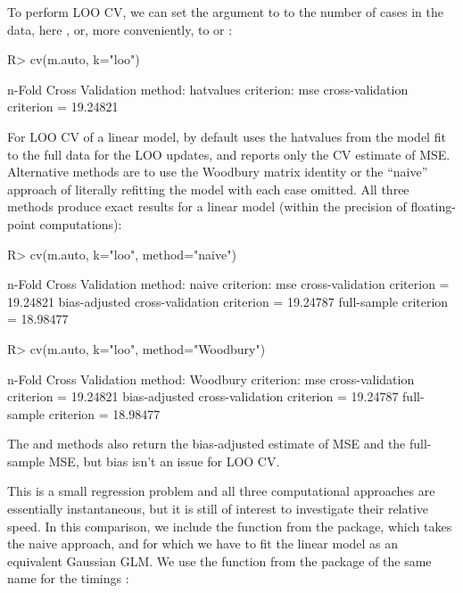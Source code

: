 \documentclass[
]{jss}
\begin{document}
To perform LOO CV, we can set the  argument to  to
the number of cases in the data, here , or, more
conveniently, to  or :

\begin{CodeChunk}
\begin{CodeInput}
R> cv(m.auto, k="loo")
\end{CodeInput}
\begin{CodeOutput}
n-Fold Cross Validation
method: hatvalues
criterion: mse
cross-validation criterion = 19.24821
\end{CodeOutput}
\end{CodeChunk}

For LOO CV of a linear model,  by default uses the hatvalues
from the model fit to the full data for the LOO updates, and reports
only the CV estimate of MSE. Alternative methods are to use the Woodbury
matrix identity or the ``naive'' approach of literally refitting the
model with each case omitted. All three methods produce exact results
for a linear model (within the precision of floating-point
computations):

\begin{CodeChunk}
\begin{CodeInput}
R> cv(m.auto, k="loo", method="naive")
\end{CodeInput}
\begin{CodeOutput}
n-Fold Cross Validation
method: naive
criterion: mse
cross-validation criterion = 19.24821
bias-adjusted cross-validation criterion = 19.24787
full-sample criterion = 18.98477 
\end{CodeOutput}
\begin{CodeInput}
R> cv(m.auto, k="loo", method="Woodbury")
\end{CodeInput}
\begin{CodeOutput}
n-Fold Cross Validation
method: Woodbury
criterion: mse
cross-validation criterion = 19.24821
bias-adjusted cross-validation criterion = 19.24787
full-sample criterion = 18.98477 
\end{CodeOutput}
\end{CodeChunk}

The  and  methods also return the
bias-adjusted estimate of MSE and the full-sample MSE, but bias isn't an
issue for LOO CV.

This is a small regression problem and all three computational
approaches are essentially instantaneous, but it is still of interest to
investigate their relative speed. In this comparison, we include the
 function from the  package, which takes the
naive approach, and for which we have to fit the linear model as an
equivalent Gaussian GLM. We use the  function
from the package of the same name for the timings \citep{Mersmann:2023}:
\end{document}
